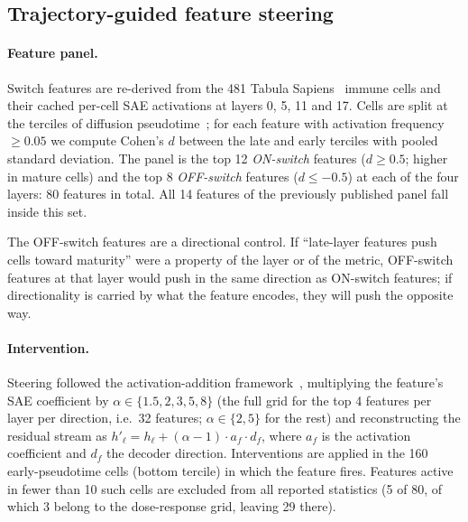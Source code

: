 \documentclass[11pt,onecolumn]{article}
\begin{document}
\subsection{Trajectory-guided feature steering}
\label{sec:steering_methods}

\paragraph{Feature panel.}
Switch features are re-derived from the 481 Tabula Sapiens~\citep{tabula2022tabula} immune cells and their cached per-cell SAE activations at layers 0, 5, 11 and 17. Cells are split at the terciles of diffusion pseudotime~\citep{haghverdi2016diffusion}; for each feature with activation frequency $\geq 0.05$ we compute Cohen's $d$ between the late and early terciles with pooled standard deviation. The panel is the top 12 \emph{ON-switch} features ($d\geq 0.5$; higher in mature cells) and the top 8 \emph{OFF-switch} features ($d\leq -0.5$) at each of the four layers: 80 features in total. All 14 features of the previously published panel fall inside this set.

The OFF-switch features are a directional control. If ``late-layer features push cells toward maturity'' were a property of the layer or of the metric, OFF-switch features at that layer would push in the same direction as ON-switch features; if directionality is carried by what the feature encodes, they will push the opposite way.

\paragraph{Intervention.}
Steering followed the activation-addition framework~\citep{turner2023activation,li2024inference}, multiplying the feature's SAE coefficient by $\alpha\in\{1.5, 2, 3, 5, 8\}$ (the full grid for the top 4 features per layer per direction, i.e.\ 32 features; $\alpha\in\{2,5\}$ for the rest) and reconstructing the residual stream as $h'_\ell = h_\ell + (\alpha-1)\cdot a_f\cdot d_f$, where $a_f$ is the activation coefficient and $d_f$ the decoder direction. Interventions are applied in the 160 early-pseudotime cells (bottom tercile) in which the feature fires. Features active in fewer than 10 such cells are excluded from all reported statistics (5 of 80, of which 3 belong to the dose-response grid, leaving 29 there).
\end{document}
